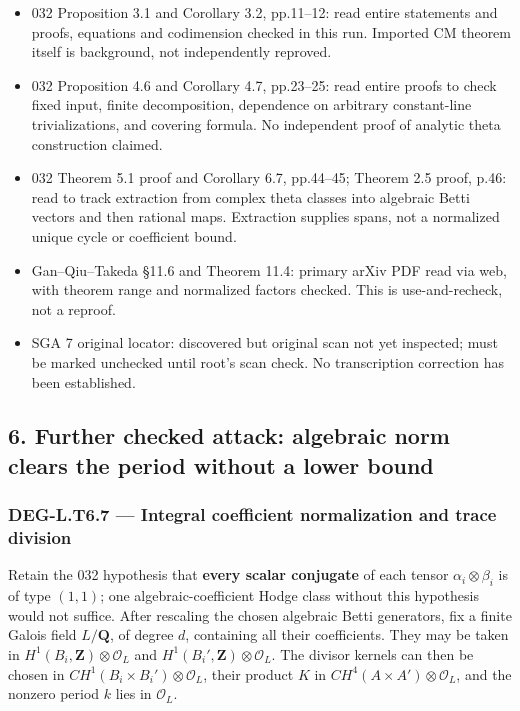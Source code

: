 \documentclass[11pt,a4paper]{article}
\providecommand{\tightlist}{\setlength{\itemsep}{0pt}\setlength{\parskip}{0pt}}
\theoremstyle{definition}
\begin{document}
\begin{itemize}
\tightlist
\item
  032 Proposition 3.1 and Corollary 3.2, pp.11--12: read entire
  statements and proofs, equations and codimension checked in this run.
  Imported CM theorem itself is background, not independently reproved.
\item
  032 Proposition 4.6 and Corollary 4.7, pp.23--25: read entire proofs
  to check fixed input, finite decomposition, dependence on arbitrary
  constant-line trivializations, and covering formula. No independent
  proof of analytic theta construction claimed.
\item
  032 Theorem 5.1 proof and Corollary 6.7, pp.44--45; Theorem 2.5 proof,
  p.46: read to track extraction from complex theta classes into
  algebraic Betti vectors and then rational maps. Extraction supplies
  spans, not a normalized unique cycle or coefficient bound.
\item
  Gan--Qiu--Takeda §11.6 and Theorem 11.4: primary arXiv PDF read via
  web, with theorem range and normalized factors checked. This is
  use-and-recheck, not a reproof.
\item
  SGA 7 original locator: discovered but original scan not yet
  inspected; must be marked unchecked until root's scan check. No
  transcription correction has been established.
\end{itemize}

\subsection{6. Further checked attack: algebraic norm clears the period
without a lower
bound}\label{further-checked-attack-algebraic-norm-clears-the-period-without-a-lower-bound}

\subsubsection{DEG-L.T6.7 --- Integral coefficient normalization and
trace
division}\label{deg-l.t6.7-integral-coefficient-normalization-and-trace-division}

Retain the 032 hypothesis that \textbf{every scalar conjugate} of each
tensor \(\alpha_i\otimes\beta_i\) is of type \((1,1)\); one
algebraic-coefficient Hodge class without this hypothesis would not
suffice. After rescaling the chosen algebraic Betti generators, fix a
finite Galois field \(L/\mathbf Q\), of degree \(d\), containing all
their coefficients. They may be taken in
\(H^1(B_i,\mathbf Z)\otimes\mathcal O_L\) and
\(H^1(B_i',\mathbf Z)\otimes\mathcal O_L\). The divisor kernels can then
be chosen in \(CH^1(B_i\times B_i')\otimes\mathcal O_L\), their product
\(K\) in \(CH^4(A\times A')\otimes\mathcal O_L\), and the nonzero period
\(k\) lies in \(\mathcal O_L\).
\end{document}
